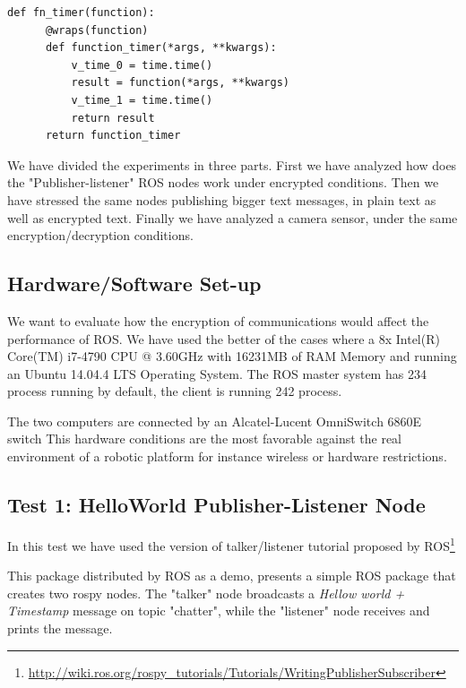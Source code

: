\documentclass[journal,twoside]{JoPhA}
\begin{document}
{
  \footnotesize{
    \begin{Verbatim}[frame=single]
def fn_timer(function):
	  @wraps(function)
	  def function_timer(*args, **kwargs):
	      v_time_0 = time.time()
	      result = function(*args, **kwargs)
	      v_time_1 = time.time()
	      return result
	  return function_timer
    \end{Verbatim}
  }
}

We have divided the experiments in three parts. First we have analyzed how does the "Publisher-listener"  ROS nodes work under encrypted conditions. Then we have stressed the same nodes publishing bigger text messages, in plain text as well as encrypted text. Finally we have analyzed a camera sensor, under the same encryption/decryption conditions.  

\subsection{Hardware/Software Set-up}



We want to evaluate how the encryption of communications would affect the performance of ROS.
We have used the better of the cases where a 8x Intel(R) Core(TM) i7-4790 CPU @ 3.60GHz
with 16231MB of RAM Memory	and running an Ubuntu 14.04.4 LTS Operating System.
The ROS master system has 234 process running by default, the client is running 242 process.

The two computers are connected by an  Alcatel-Lucent OmniSwitch 6860E switch
This hardware conditions are the most favorable against the real environment of a robotic platform for instance wireless or hardware restrictions.


\subsection{Test 1: HelloWorld Publisher-Listener Node}

In this test we have used the version of talker/listener tutorial proposed by ROS\footnote{\url{http://wiki.ros.org/rospy_tutorials/Tutorials/WritingPublisherSubscriber}}

This package distributed by ROS as a demo, presents a simple ROS package that creates two rospy nodes. The "talker" node broadcasts a {\em Hellow world + Timestamp} message on topic "chatter", while the "listener" node receives and prints the message.
\end{document}
